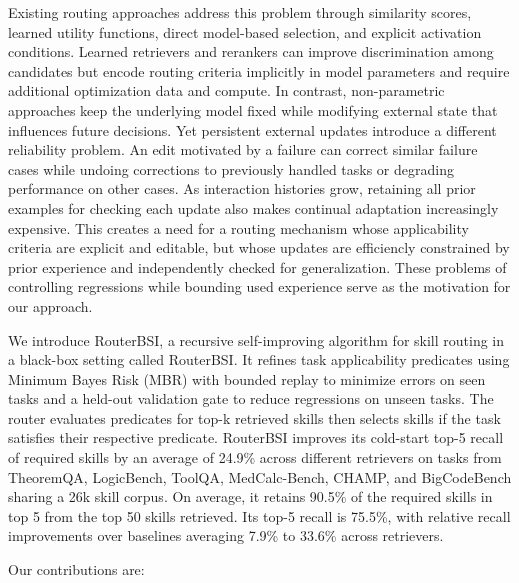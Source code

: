 Existing routing approaches address this problem through similarity scores, learned utility functions, direct model-based selection, and explicit activation conditions. Learned retrievers and rerankers can improve discrimination among candidates but encode routing criteria implicitly in model parameters and require additional optimization data and compute. In contrast, non-parametric approaches keep the underlying model fixed while modifying external state that influences future decisions. Yet persistent external updates introduce a different reliability problem. An edit motivated by a failure can correct similar failure cases while undoing corrections to previously handled tasks or degrading performance on other cases. As interaction histories grow, retaining all prior examples for checking each update also makes continual adaptation increasingly expensive. This creates a need for a routing mechanism whose applicability criteria are explicit and editable, but whose updates are efficiencly constrained by prior experience and independently checked for generalization. These problems of controlling regressions while bounding used experience serve as the motivation for our approach.

We introduce RouterBSI, a recursive self-improving algorithm for skill routing in a black-box setting called RouterBSI. It refines task applicability predicates using Minimum Bayes Risk (MBR) with bounded replay to minimize errors on seen tasks and a held-out validation gate to reduce regressions on unseen tasks. The router evaluates predicates for top-k retrieved skills then selects skills if the task satisfies their respective predicate. RouterBSI improves its cold-start top-5 recall of required skills by an average of 24.9\% across different retrievers on tasks from TheoremQA, LogicBench, ToolQA, MedCalc-Bench, CHAMP, and BigCodeBench sharing a 26k skill corpus. On average, it retains 90.5\% of the required skills in top 5 from the top 50 skills retrieved. Its top-5 recall is 75.5\%, with relative recall improvements over baselines averaging 7.9\% to 33.6\% across retrievers.

Our contributions are:

